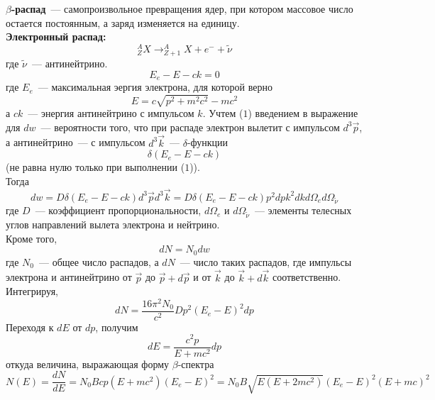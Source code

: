 \documentclass[12pt]{article}
\begin{document}
\textbf{$\beta$-распад}~--- самопроизвольное превращения ядер, при котором
массовое число остается постоянным, а заряд изменяется на единицу.
\\
\textbf{Электронный распад:}
\begin{equation*}
    ^A_ZX \to ^A_{Z+1}X+e^-+\tilde{\nu}
\end{equation*}
где $\tilde{\nu}$~--- антинейтрино.
\begin{equation}
    \label{eq:(1)}
    E_e-E-ck = 0
\end{equation}
где $E_e$~--- максимальная эергия электрона, для которой верно
\begin{equation}
    \label{eq:(2)}
    E = c\sqrt{p^2+m^2c^2}-mc^2
\end{equation}
а $ck$~--- энергия антинейтрино с импульсом $k$. Учтем ($1$) введением в
выражение для $dw$~--- вероятности того, что при распаде электрон вылетит с
импульсом $d^3\vec{p}$, а антинейтрино~--- с импульсом $d^3\vec{k}$~--- $\delta$-функции
\begin{equation}
    \label{eq:(3)}
    \delta(E_e-E-ck)
\end{equation}
(не равна нулю только при выполнении ($1$)).
\\
Тогда
\begin{equation}
    \label{eq:(4)}
    dw = D\delta(E_e-E-ck)d^3\vec{p}d^3\vec{k} = D\delta(E_e-E-ck)p^2dpk^2dkd\Omega_ed\Omega_{\tilde{\nu}}
\end{equation}
где $D$~--- коэффициент пропорциональности, $d\Omega_e$ и
$d\Omega_{\tilde{\nu}}$~--- элементы телесных углов направлений вылета электрона
и нейтрино.
\\
Кроме того,
\begin{equation}
    \label{eq:(5)}
    dN = N_0dw
\end{equation}
где $N_0$~--- общее число распадов, а $dN$~--- число таких распадов, где
импульсы электрона и антинейтрино от $\vec{p}$ до $\vec{p}+d\vec{p}$ и от
$\vec{k}$ до $\vec{k}+d\vec{k}$ соответственно.
\\
Интегрируя,
\begin{equation}
    \label{eq:(6)}
    dN = \frac{16\pi^2N_0}{c^2}Dp^2(E_e-E)^2dp
\end{equation}
Переходя к $dE$ от $dp$, получим
\begin{equation}
    \label{eq:(7)}
    dE = \frac{c^2p}{E+mc^2}dp
\end{equation}
откуда величина, выражающая форму $\beta$-спектра
\begin{equation}
    \label{eq:(8)}
    N(E) = \frac{dN}{dE} = N_0Bcp(E+mc^2)(E_e-E)^2 = N_0B\sqrt{E(E+2mc^2)}(E_e-E)^2(E+mc)^2
\end{equation}
\end{document}
